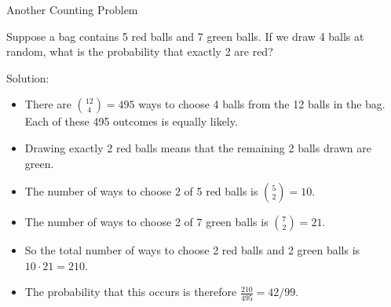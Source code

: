 \documentclass[xcolor=table]{beamer}
\renewcommand{\emph}{\textbf}
\begin{document}
%
%

\begin{frame}{Another Counting Problem}
\begin{block}{}
Suppose a bag contains 5 red balls and 7 green balls. If we draw 4 balls at random, what is the probability that exactly 2 are red?
\end{block}

\pause Solution:
\begin{itemize}
\pause \item There are $\binom{12}4=495$ ways to choose 4 balls from the 12 balls in the bag. Each of these 495 outcomes is equally likely. 
\pause \item Drawing exactly 2 red balls means that the remaining 2 balls drawn are green.
\pause \item The number of ways to choose 2 of 5 red balls is $\binom 5 2= 10$.
\pause \item The number of ways to choose 2 of 7 green balls is $\binom 7 2=21$.
\pause \item So the total number of ways to choose 2 red balls and 2 green balls is $10 \cdot 21= 210$. 
\pause \item The probability that this occurs is therefore $\frac{210}{495} = 42/99$.
\end{itemize}
\end{frame}
\end{document}
